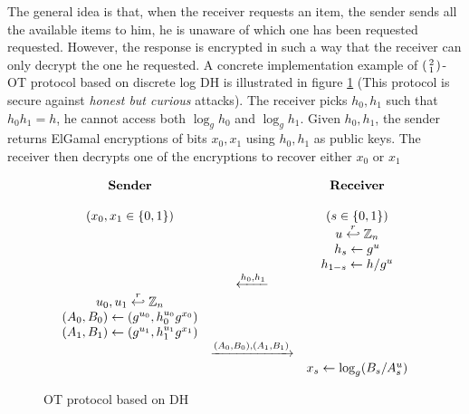 The general idea is that, when the receiver requests an item, the sender sends
all the available items to him, he is unaware of which one has been requested
requested. However, the response is encrypted in such a way that the receiver
can only decrypt the one he requested. A concrete implementation example of
\(\begin{psmallmatrix} 2 \\ 1 \end{psmallmatrix} \)-OT protocol based on
discrete log DH is illustrated in figure \ref{fig:DH21OT} (This protocol is
secure against \textit{honest but curious} attacks). The receiver picks
\(h_{0},h_{1}\) such that \(h_{0}h_{1} = h\), he cannot access both
\(\log_{g}h_{0}\) and \(\log_{g}h_{1}\). Given \(h_{0}, h_{1}\), the sender
returns ElGamal encryptions of bits \(x_{0}, x_{1}\) using \(h_{0},h_{1}\) as
public keys. The receiver then decrypts one of the encryptions to recover either
\(x_{0} \text{ or } x_{1}\)

\begin{figure}[h!]
  \centering
  \begin{equation*}
    \begin{array}{c c c}
      \text{\textbf{Sender}} & & \text{\textbf{Receiver}} \\
      \\
      (x_{0}, x_{1} \in \{0,1\}) & & (s \in \{0,1\}) \\
                             & & u \stackrel{r}{\hookleftarrow} \mathbb{Z}_{n}\\
                             & & h_{s} \gets g^{u}\\
                             & & h_{1-s} \gets h/g^{u}\\
                             & \xleftarrow{h_{0}, h_{1}} & \\
      u_{0}, u_{1} \stackrel{r}{\hookleftarrow} \mathbb{Z}_{n} & & \\
      (A_{0}, B_{0}) \gets (g^{u_{0}}, h_{0}^{u_{0}}g^{x_{0}}) & & \\
      (A_{1}, B_{1}) \gets (g^{u_{1}}, h_{1}^{u_{1}}g^{x_{1}}) & & \\
                             & \xrightarrow{(A_{0}, B_{0}),(A_{1}, B_{1})} & \\
      & & x_{s} \gets \log_{g}(B_{s}/A_{s}^{u})
    \end{array}
  \end{equation*}
  \caption{OT protocol based on DH}
  \label{fig:DH21OT}
\end{figure}

